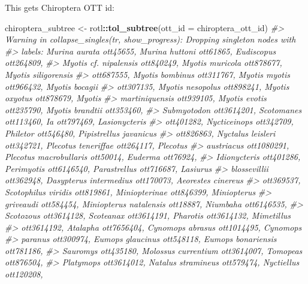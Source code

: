 \documentclass[]{article}
\newenvironment{Shaded}{\begin{snugshade}}{\end{snugshade}}
\newcommand{\CommentTok}[1]{\textcolor[rgb]{0.56,0.35,0.01}{\textit{#1}}}
\newcommand{\DataTypeTok}[1]{\textcolor[rgb]{0.13,0.29,0.53}{#1}}
\newcommand{\KeywordTok}[1]{\textcolor[rgb]{0.13,0.29,0.53}{\textbf{#1}}}
\newcommand{\NormalTok}[1]{#1}
\newcommand{\OperatorTok}[1]{\textcolor[rgb]{0.81,0.36,0.00}{\textbf{#1}}}
\newcommand{\StringTok}[1]{\textcolor[rgb]{0.31,0.60,0.02}{#1}}
\begin{document}
This gets Chiroptera OTT id:

\begin{Shaded}
\end{Shaded}

\begin{Shaded}
\begin{Highlighting}[]
\NormalTok{chiroptera_subtree <-}\StringTok{ }\NormalTok{rotl}\OperatorTok{::}\KeywordTok{tol_subtree}\NormalTok{(}\DataTypeTok{ott_id =}\NormalTok{ chiroptera_ott_id)}
\CommentTok{#> Warning in collapse_singles(tr, show_progress): Dropping singleton nodes with}
\CommentTok{#> labels: Murina aurata ott45655, Murina huttoni ott61865, Eudiscopus ott264809,}
\CommentTok{#> Myotis cf. nipalensis ott840249, Myotis muricola ott878677, Myotis siligorensis}
\CommentTok{#> ott687555, Myotis bombinus ott311767, Myotis myotis ott966432, Myotis bocagii}
\CommentTok{#> ott307135, Myotis nesopolus ott898241, Myotis oxyotus ott878679, Myotis}
\CommentTok{#> martiniquensis ott939105, Myotis evotis ott235790, Myotis brandtii ott353460,}
\CommentTok{#> Submyotodon ott3614201, Scotomanes ott113460, Ia ott797469, Lasionycteris}
\CommentTok{#> ott401282, Nycticeinops ott342709, Philetor ott546480, Pipistrellus javanicus}
\CommentTok{#> ott826863, Nyctalus leisleri ott342721, Plecotus teneriffae ott264117, Plecotus}
\CommentTok{#> austriacus ott1080291, Plecotus macrobullaris ott50014, Euderma ott76924,}
\CommentTok{#> Idionycteris ott401286, Perimyotis ott6146540, Parastrellus ott716687, Lasiurus}
\CommentTok{#> blossevillii ott362948, Dasypterus intermedius ott170073, Aeorestes cinereus}
\CommentTok{#> ott369537, Scotophilus viridis ott819861, Miniopterinae ott846399, Miniopterus}
\CommentTok{#> griveaudi ott584454, Miniopterus natalensis ott18887, Niumbaha ott6146535,}
\CommentTok{#> Scotozous ott3614128, Scoteanax ott3614191, Pharotis ott3614132, Mimetillus}
\CommentTok{#> ott3614192, Atalapha ott7656404, Cynomops abrasus ott1014495, Cynomops}
\CommentTok{#> paranus ott300974, Eumops glaucinus ott548118, Eumops bonariensis ott781186,}
\CommentTok{#> Sauromys ott435180, Molossus currentium ott3614007, Tomopeas ott876504,}
\CommentTok{#> Platymops ott3614012, Natalus stramineus ott579474, Nyctiellus ott120208,}

\end{Highlighting}
\end{Shaded}
\end{document}
